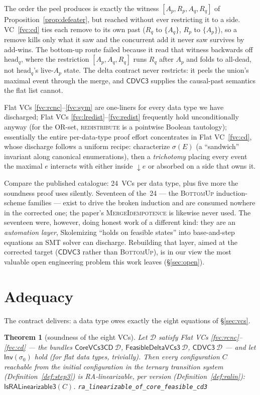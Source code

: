 \documentclass[11pt]{article}
\newtheorem{theorem}{Theorem}[section]
\newcommand{\Sinit}{\sigma_0}
\newcommand{\dow}[1]{{\downarrow}#1}
\newcommand{\co}{\mathsf{CoreVCs3CD}}
\newcommand{\fd}{\mathsf{FeasibleDeltaVCs3}}
\newcommand{\cd}{\mathsf{CDVC3}}
\newcommand{\lean}[1]{\texttt{#1}}
\newcommand{\M}[1]{\mathcal{#1}}
\newcommand{\Inv}{\mathsf{Inv}}
\begin{document}
The order the peel produces is exactly the witness $[A_p, R_p, A_q, R_q]$ of
Proposition~\ref{prop:defeater}, but reached without ever restricting it to a
side. VC~\ref{fvc:cd} ties each remove to its own past ($R_q$ to $\{A_q\}$,
$R_p$ to $\{A_p\}$), so a remove kills only what it saw and the concurrent add
it never saw survives by add-wins. The bottom-up route failed because it read
that witness backwards off $\mathrm{head}_q$, where the restriction
$[A_p, A_q, R_q]$ runs $R_q$ after $A_p$ and folds to all-dead, not
$\mathrm{head}_q$'s live-$A_p$ state. The delta contract never restricts: it
peels the union's maximal event through the merge, and $\cd$ supplies the
causal-past semantics the flat list cannot.

Flat VCs \ref{fvc:rcnc}--\ref{fvc:sym} are one-liners for every data
type we have discharged; Flat VCs \ref{fvc:lredist}--\ref{fvc:redist}
frequently hold unconditionally anyway (for the OR-set,
\textsc{redistribute} is a pointwise Boolean tautology); essentially the
entire per-data-type proof effort concentrates in Flat
VC~\ref{fvc:cd}, whose discharge follows a uniform recipe:
characterize $\sigma(E)$ (a ``sandwich'' invariant along canonical
enumerations), then a \emph{trichotomy} placing every event the maximal
$e$ interacts with either inside $\dow{e}$ or absorbed on a side that
owns it.

Compare the published catalogue: 24~VCs per data type, plus five more the
soundness proof uses silently. Seventeen of the~24 --- the
\textsc{BottomUp} induction-scheme families --- exist to drive the broken
induction and are consumed nowhere in the corrected one; the paper's
\textsc{MergeIdempotence} is likewise never used. The seventeen were,
however, doing honest work of a different kind: they are an
\emph{automation layer}, Skolemizing ``holds on feasible states'' into
base-and-step equations an SMT solver can discharge. Rebuilding that
layer, aimed at the corrected target ($\cd$ rather than \textsc{BottomUp}),
is in our view the most valuable open engineering problem this work
leaves (\S\ref{sec:open}).

\section{Adequacy}
\label{sec:adequacy}

The contract delivers: a data type owes exactly the eight equations of
\S\ref{sec:vcs}.

\begin{theorem}[soundness of the eight VCs]
\label{thm:main}
Let $\M{D}$ satisfy Flat VCs \ref{fvc:rcnc}--\ref{fvc:cd} --- the
bundles $\co\ \M{D}$, $\fd\ \M{D}$, $\cd\ \M{D}$ --- and let
$\Inv(\Sinit)$ hold (for flat data types, trivially). Then every
configuration $C$ reachable from the initial configuration in the
ternary transition system (Definition~\ref{def:step3}) is
RA-linearizable, per version (Definition~\ref{def:ralin}):
$\mathsf{IsRALinearizable3}(C)$.
\hfill\lean{ra\_linearizable\_of\_core\_feasible\_cd3}
\end{theorem}
\end{document}
